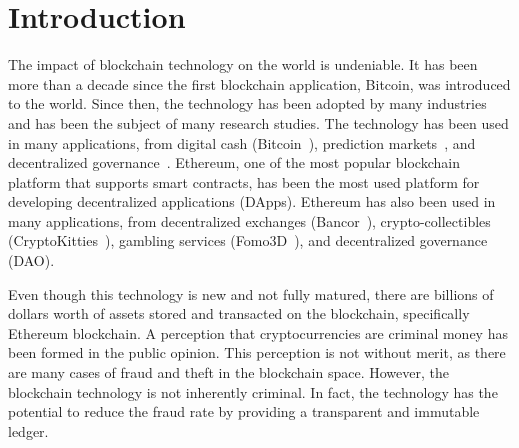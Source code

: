 








\chapter{Introduction} \label{sec:intro}

The impact of blockchain technology on the world is undeniable. It has been more than a decade since the first blockchain application, Bitcoin, was introduced to the world. Since then, the technology has been adopted by many industries and has been the subject of many research studies. The technology has been used in many applications, from digital cash (\eg Bitcoin~\cite{nakamoto2008bitcoin}), prediction markets~\cite{clark2014decentralizing}, and decentralized governance~\cite{aragonwebsite}. Ethereum, one of the most popular blockchain platform that supports smart contracts, has been the most used platform for developing decentralized applications (DApps). Ethereum has also been used in many applications, from decentralized exchanges (\eg Bancor~\cite{hertzog2017bancor}), crypto-collectibles (\eg CryptoKitties~\cite{cryptokitties}), gambling services (\eg Fomo3D~\cite{fomo3dmedium}), and decentralized governance (\eg DAO).

Even though this technology is new and not fully matured, there are billions of dollars worth of assets stored and transacted on the blockchain, specifically Ethereum blockchain. A perception that cryptocurrencies are criminal money has been formed in the public opinion. This perception is not without merit, as there are many cases of fraud and theft in the blockchain space. However, the blockchain technology is not inherently criminal. In fact, the technology has the potential to reduce the fraud rate by providing a transparent and immutable ledger.

